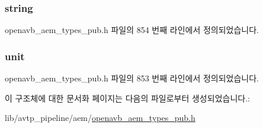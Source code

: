 \subsubsection[{\texorpdfstring{string}{string}}]{ string}\hypertarget{structopenavb__aem__control__value__format__control__linear__float__t_a1f81001cefa769cb3651172fd5ab0748}{}\label{structopenavb__aem__control__value__format__control__linear__float__t_a1f81001cefa769cb3651172fd5ab0748}


openavb\+\_\+aem\+\_\+types\+\_\+pub.\+h 파일의 854 번째 라인에서 정의되었습니다.

\subsubsection[{\texorpdfstring{unit}{unit}}]{ unit}\hypertarget{structopenavb__aem__control__value__format__control__linear__float__t_a0b3ff376c10369016824076deacc055e}{}\label{structopenavb__aem__control__value__format__control__linear__float__t_a0b3ff376c10369016824076deacc055e}


openavb\+\_\+aem\+\_\+types\+\_\+pub.\+h 파일의 853 번째 라인에서 정의되었습니다.



이 구조체에 대한 문서화 페이지는 다음의 파일로부터 생성되었습니다.\+:\begin{DoxyCompactItemize}
\item 
lib/avtp\+\_\+pipeline/aem/\hyperlink{openavb__aem__types__pub_8h}{openavb\+\_\+aem\+\_\+types\+\_\+pub.\+h}\end{DoxyCompactItemize}
